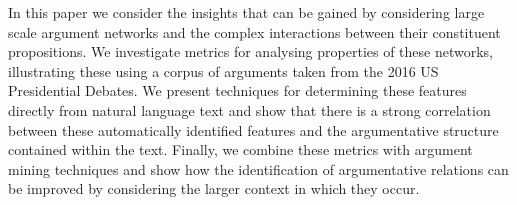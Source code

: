 In this paper we consider the insights that can be gained by considering large scale argument networks and the complex interactions between their constituent propositions. We investigate metrics for analysing properties of these networks, illustrating these using a corpus of arguments taken from the 2016 US Presidential Debates. We present techniques for determining these features directly from natural language text and show that there is a strong correlation between these automatically identified features and the argumentative structure contained within the text. Finally, we combine these metrics with argument mining techniques and show how the identification of argumentative relations can be improved by considering the larger context in which they occur.
